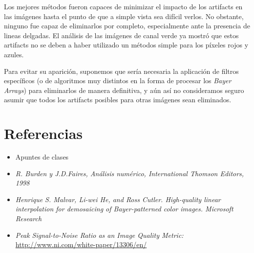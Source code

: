 \documentclass[a4paper]{article}
\begin{document}
Los mejores métodos fueron capaces de minimizar el impacto de los artifacts en las imágenes hasta el punto de que a simple vista sea difícil verlos. No obstante, ninguno fue capaz de eliminarlos por completo, especialmente ante la presencia de lineas delgadas. El análisis de las imágenes de canal verde ya mostró que estos artifacts no se deben a haber utilizado un métodos simple para los píxeles rojos y azules.

Para evitar su aparición, suponemos que sería necesaria la aplicación de filtros específicos (o de algoritmos muy distintos en la forma de procesar los \textit{Bayer Arrays}) para eliminarlos de manera definitiva, y aún así no consideramos seguro asumir que todos los artifacts posibles para otras imágenes sean eliminados.

\newpage


\section{Referencias}
\label{sec:ref}

\begin{itemize}
\item Apuntes de clases

\item \textit{R. Burden y J.D.Faires, Análisis numérico, International Thomson Editors, 1998}

\item \textit{Henrique S. Malvar, Li-wei He, and Ross Cutler. High-quality linear interpolation for demosaicing of Bayer-patterned color images. Microsoft Research}

\item \textit{Peak Signal-to-Noise Ratio as an Image Quality Metric:} \\ \indent \url{http://www.ni.com/white-paper/13306/en/}
\end{itemize}
\end{document}
